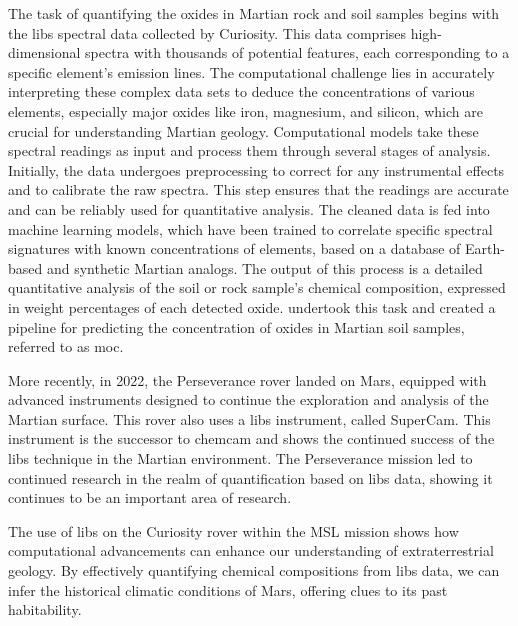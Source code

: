 The task of quantifying the oxides in Martian rock and soil samples begins with the \gls{libs} spectral data collected by Curiosity. This data comprises high-dimensional spectra with thousands of potential features, each corresponding to a specific element's emission lines. The computational challenge lies in accurately interpreting these complex data sets to deduce the concentrations of various elements, especially major oxides like iron, magnesium, and silicon, which are crucial for understanding Martian geology.
Computational models take these spectral readings as input and process them through several stages of analysis. Initially, the data undergoes preprocessing to correct for any instrumental effects and to calibrate the raw spectra. This step ensures that the readings are accurate and can be reliably used for quantitative analysis. 
The cleaned data is fed into machine learning models, which have been trained to correlate specific spectral signatures with known concentrations of elements, based on a database of Earth-based and synthetic Martian analogs.
The output of this process is a detailed quantitative analysis of the soil or rock sample's chemical composition, expressed in weight percentages of each detected oxide\cite{wiensPreflightCalibrationInitial2013, cleggRecalibrationMarsScience2017}.
\citet{cleggRecalibrationMarsScience2017} undertook this task and created a pipeline for predicting the concentration of oxides in Martian soil samples, referred to as \gls{moc}.

More recently, in 2022, the Perseverance rover landed on Mars, equipped with advanced instruments designed to continue the exploration and analysis of the Martian surface. This rover also uses a \gls{libs} instrument, called SuperCam. This instrument is the successor to \gls{chemcam} and shows the continued success of the \gls{libs} technique in the Martian environment. The Perseverance mission led to continued research in the realm of quantification based on \gls{libs} data\cite{andersonPostlandingMajorElement2022}, showing it continues to be an important area of research.

The use of \gls{libs} on the Curiosity rover within the MSL mission shows how computational advancements can enhance our understanding of extraterrestrial geology. By effectively quantifying chemical compositions from \gls{libs} data, we can infer the historical climatic conditions of Mars, offering clues to its past habitability.

